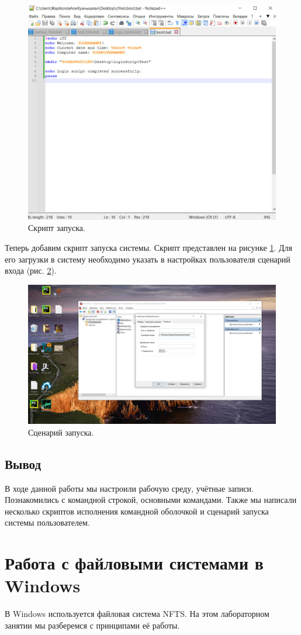\begin{figure}[h!]
    \centering
    \includegraphics[width=0.6\linewidth]{Pic/lab1/photo_2025-05-21_08-16-01.jpg}
    \caption{Скрипт запуска.}
    \label{fig:boot-script}
\end{figure}

Теперь добавим скрипт запуска системы. Скрипт представлен на рисунке \ref{fig:boot-script}. Для его загрузки в систему необходимо указать в настройках пользователя сценарий входа (рис. \ref{fig:scenario}).

\begin{figure}[h!]
    \centering
    \includegraphics[width=0.4\linewidth]{Pic/lab1/photo_2025-05-21_08-15-59.jpg}
    \caption{Сценарий запуска.}
    \label{fig:scenario}
\end{figure}
\newpage
\subsection{Вывод}

В ходе данной работы мы настроили рабочую среду, учётные записи. Познакомились с командной строкой, основными командами. Также мы написали несколько скриптов исполнения командной оболочкой и сценарий запуска системы пользователем. 
\newpage


\section{Работа с файловыми системами в Windows}
В Windows используется файловая система NFTS. На этом лабораторном занятии мы разберемся с принципами её работы.
\label{LAB2}

